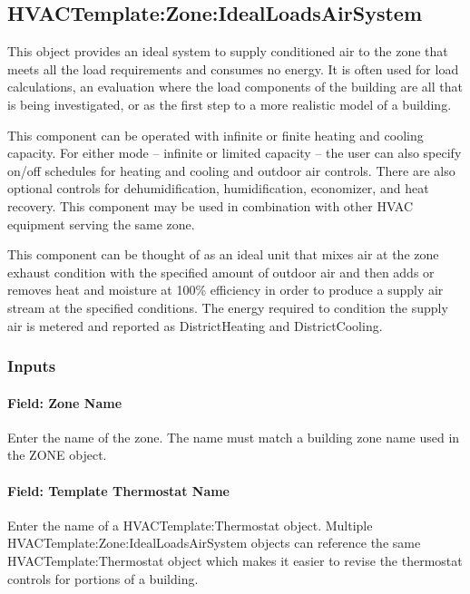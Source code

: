 \subsection{HVACTemplate:Zone:IdealLoadsAirSystem}\label{hvactemplatezoneidealloadsairsystem}

This object provides an ideal system to supply conditioned air to the zone that meets all the load requirements and consumes no energy. It is often used for load calculations, an evaluation where the load components of the building are all that is being investigated, or as the first step to a more realistic model of a building.

This component can be operated with infinite or finite heating and cooling capacity. For either mode -- infinite or limited capacity -- the user can also specify on/off schedules for heating and cooling and outdoor air controls. There are also optional controls for dehumidification, humidification, economizer, and heat recovery. This component may be used in combination with other HVAC equipment serving the same zone.

This component can be thought of as an ideal unit that mixes air at the zone exhaust condition with the specified amount of outdoor air and then adds or removes heat and moisture at 100\% efficiency in order to produce a supply air stream at the specified conditions. The energy required to condition the supply air is metered and reported as DistrictHeating and DistrictCooling.

\subsubsection{Inputs}\label{inputs-1-022}

\paragraph{Field: Zone Name}\label{field-zone-name-006}

Enter the name of the zone. The name must match a building zone name used in the ZONE object.

\paragraph{Field: Template Thermostat Name}\label{field-template-thermostat-name}

Enter the name of a HVACTemplate:Thermostat object. Multiple HVACTemplate:Zone:IdealLoadsAirSystem objects can reference the same HVACTemplate:Thermostat object which makes it easier to revise the thermostat controls for portions of a building.

